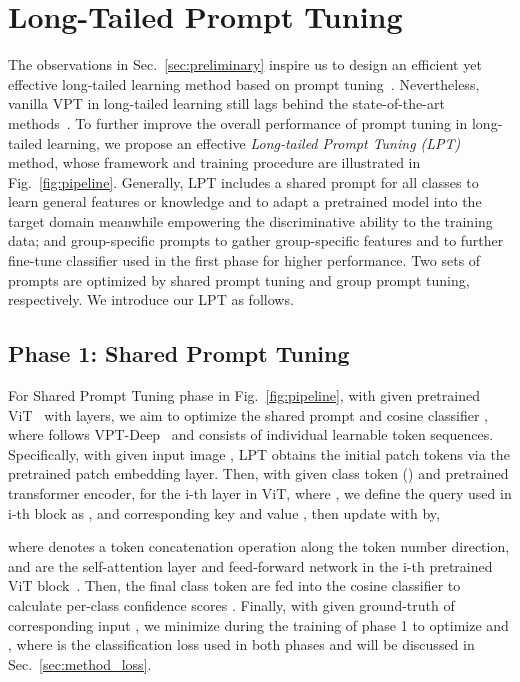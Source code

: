 \documentclass{article} \usepackage{iclr2023_conference,times}
\begin{document}
\vspace{-0.5em}
\section{Long-Tailed Prompt Tuning}\label{sec:method}
\vspace{-0.5em}
The  observations in Sec.~\ref{sec:preliminary} inspire us to design an efficient yet effective long-tailed learning method based on prompt tuning~\citep{jia2022vpt}. 
Nevertheless, vanilla VPT in long-tailed learning still lags behind the state-of-the-art methods~\citep{tian2021vl,Long2022}. 
To further improve the overall performance of prompt tuning in long-tailed learning, we propose an effective \textit{Long-tailed Prompt Tuning (LPT)} method, whose framework and training procedure are illustrated  in Fig.~\ref{fig:pipeline}. 
Generally, LPT includes a shared prompt for all classes to learn general features or knowledge and to adapt a pretrained model into the target domain meanwhile empowering the discriminative ability to the training data; and group-specific prompts to gather group-specific features and to  further fine-tune classifier used in the first phase for higher performance.  
Two sets of prompts are optimized by shared prompt tuning and group prompt tuning, respectively. 
We introduce our  LPT as follows.

\vspace{-0.3em}
\subsection{Phase 1: Shared Prompt Tuning}\label{sec:method_phase1}
\vspace{-0.4em}
For Shared Prompt Tuning phase in Fig.~\ref{fig:pipeline}, with given pretrained ViT~\citep{dosovitskiy2021an} with  layers, we aim to optimize the shared prompt  and cosine classifier , where  follows VPT-Deep~\citep{jia2022vpt} and consists of  individual learnable token sequences. 
Specifically, with given input image , LPT obtains the initial patch tokens  via the pretrained patch embedding layer. 
Then, with given class token (\text{[CLS]})  and pretrained transformer encoder, for the i-th layer in ViT, where , we define the query used in i-th block as , and corresponding key and value , then update  with  by, 

where  denotes a token concatenation operation along the token number direction,   and  are the self-attention layer and feed-forward network in the i-th pretrained ViT block~\citep{vaswani2017attention}. 
Then, the final class token  are fed into the cosine classifier  to calculate per-class confidence scores  . 
Finally, with given ground-truth  of corresponding input , we minimize  during the training of phase 1 to optimize  and , 
where  is the classification loss used in both phases and will be discussed in Sec.~\ref{sec:method_loss}.
\end{document}
